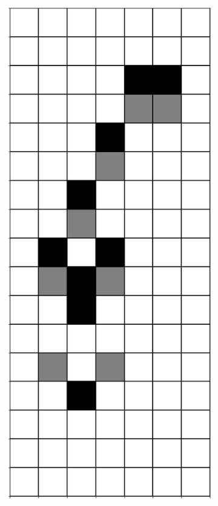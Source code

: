 \documentclass[12pt]{article}
\numberwithin{figure}{section} %
\begin{document}
\begin{figure}[H]
\begin{subfigure}{0.3\textwidth}
     		\subcaption{}
   	\end{subfigure}
        \begin{subfigure}{0.3\textwidth}
     		\centering
     		\includegraphics[angle=270,width=\linewidth]{Section4/14.2}

\end{subfigure}
\end{figure}
\end{document}
